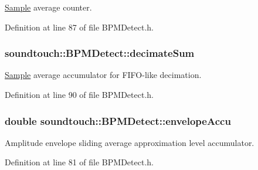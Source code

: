 \hyperlink{struct_sample}{Sample} average counter. 



Definition at line 87 of file B\+P\+M\+Detect.\+h.

\subsubsection[{\texorpdfstring{decimate\+Sum}{decimateSum}}]{ soundtouch\+::\+B\+P\+M\+Detect\+::decimate\+Sum\hspace{0.3cm}{\ttfamily [protected]}}\hypertarget{classsoundtouch_1_1_b_p_m_detect_a7d19d38a72aeff0da916284b4789ccd6}{}\label{classsoundtouch_1_1_b_p_m_detect_a7d19d38a72aeff0da916284b4789ccd6}


\hyperlink{struct_sample}{Sample} average accumulator for F\+I\+F\+O-\/like decimation. 



Definition at line 90 of file B\+P\+M\+Detect.\+h.

\subsubsection[{\texorpdfstring{envelope\+Accu}{envelopeAccu}}]{\setlength{\rightskip}{0pt plus 5cm}double soundtouch\+::\+B\+P\+M\+Detect\+::envelope\+Accu\hspace{0.3cm}{\ttfamily [protected]}}\hypertarget{classsoundtouch_1_1_b_p_m_detect_a0bb45b54b872a9a88ed114cadc32a02f}{}\label{classsoundtouch_1_1_b_p_m_detect_a0bb45b54b872a9a88ed114cadc32a02f}


Amplitude envelope sliding average approximation level accumulator. 



Definition at line 81 of file B\+P\+M\+Detect.\+h.

